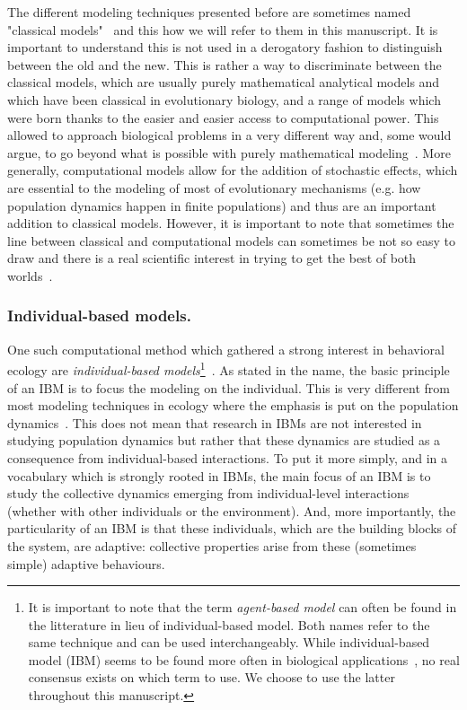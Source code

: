     The different modeling techniques presented before are sometimes named "classical models"~\cite{DeAngelis2005, Adami2014} and this how we will refer to them in this manuscript. It is important to understand this is not used in a derogatory fashion to distinguish between the old and the new. This is rather a way to discriminate between the classical models, which are usually purely mathematical analytical models and which have been classical in evolutionary biology, and a range of models which were born thanks to the easier and easier access to computational power. This allowed to approach biological problems in a very different way and, some would argue, to go beyond what is possible with purely mathematical modeling~\cite{Adami2012}. More generally, computational models allow for the addition of stochastic effects, which are essential to the modeling of most of evolutionary mechanisms (e.g. how population dynamics happen in finite populations) and thus are an important addition to classical models. However, it is important to note that sometimes the line between classical and computational models can sometimes be not so easy to draw and there is a real scientific interest in trying to get the best of both worlds~\cite{Wilson1998}.

    \subsubsection{Individual-based models.} One such computational method which gathered a strong interest in behavioral ecology are \emph{individual-based models}\footnote{It is important to note that the term \emph{agent-based model} can often be found in the litterature in lieu of individual-based model. Both names refer to the same technique and can be used interchangeably. While individual-based model (IBM) seems to be found more often in biological applications~\cite{Grimm2005}, no real consensus exists on which term to use. We choose to use the latter throughout this manuscript.}~\cite{Huston1988}. As stated in the name, the basic principle of an IBM is to focus the modeling on the individual. This is very different from most modeling techniques in ecology where the emphasis is put on the population dynamics~\cite{Grimm2005}. This does not mean that research in IBMs are not interested in studying population dynamics but rather that these dynamics are studied as a consequence from individual-based interactions. To put it more simply, and in a vocabulary which is strongly rooted in IBMs, the main focus of an IBM is to study the collective dynamics emerging from individual-level interactions (whether with other individuals or the environment). And, more importantly, the particularity of an IBM is that these individuals, which are the building blocks of the system, are adaptive: collective properties arise from these (sometimes simple) adaptive behaviours.

